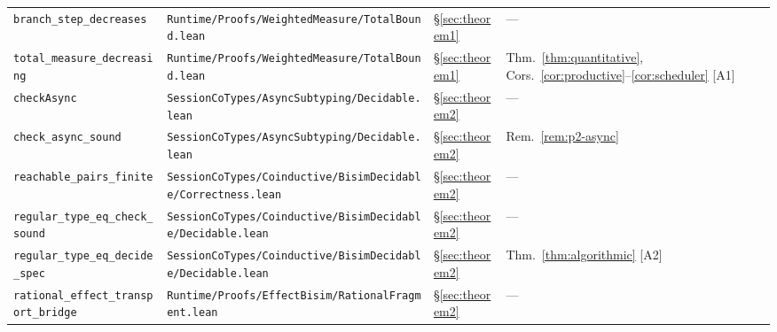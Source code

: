 \documentclass[a4paper,10pt,twocolumn,english]{article}
\numberwithin{equation}{section}
\theoremstyle{paperdef}
\theoremstyle{paperplain}
\theoremstyle{paperdef}
\theoremstyle{paperremark}
\begin{document}
\begin{table}[H]
\begin{tabularx}{\textwidth}{L{0.27\textwidth}L{0.37\textwidth}L{0.06\textwidth}>{\raggedright\arraybackslash}X}
		\texttt{branch\_step\_decreases}                                & \texttt{Runtime/\allowbreak Proofs/\allowbreak WeightedMeasure/\allowbreak}\mbox{\texttt{TotalBound.lean}}                        & \S\ref{sec:theorem1}     & ---                                                                               \\
		\texttt{total\_measure\_\allowbreak decreasing}                 & \texttt{Runtime/\allowbreak Proofs/\allowbreak WeightedMeasure/\allowbreak}\mbox{\texttt{TotalBound.lean}}                        & \S\ref{sec:theorem1}     & Thm.~\ref{thm:quantitative}, Cors.~\ref{cor:productive}--\ref{cor:scheduler} [A1] \\
		\texttt{checkAsync}                                             & \texttt{SessionCoTypes/\allowbreak AsyncSubtyping/\allowbreak}\mbox{\texttt{Decidable.lean}}                                      & \S\ref{sec:theorem2}     & ---                                                                               \\
		\texttt{check\_async\_\allowbreak sound}                        & \texttt{SessionCoTypes/\allowbreak AsyncSubtyping/\allowbreak}\mbox{\texttt{Decidable.lean}}                                      & \S\ref{sec:theorem2}     & Rem.~\ref{rem:p2-async}                                                           \\
		\texttt{reachable\_pairs\_\allowbreak finite}                   & \texttt{SessionCoTypes/\allowbreak Coinductive/\allowbreak BisimDecidable/\allowbreak}\mbox{\texttt{Correctness.lean}}            & \S\ref{sec:theorem2}     & ---                                                                               \\
		\texttt{regular\_type\_eq\_\allowbreak check\_sound}            & \texttt{SessionCoTypes/\allowbreak Coinductive/\allowbreak BisimDecidable/\allowbreak}\mbox{\texttt{Decidable.lean}}              & \S\ref{sec:theorem2}     & ---                                                                               \\
		\texttt{regular\_type\_eq\_\allowbreak decide\_spec}            & \texttt{SessionCoTypes/\allowbreak Coinductive/\allowbreak BisimDecidable/\allowbreak}\mbox{\texttt{Decidable.lean}}              & \S\ref{sec:theorem2}     & Thm.~\ref{thm:algorithmic} [A2]                                                   \\
		\texttt{rational\_effect\_\allowbreak transport\_bridge}        & \texttt{Runtime/\allowbreak Proofs/\allowbreak EffectBisim/\allowbreak}\mbox{\texttt{RationalFragment.lean}}                      & \S\ref{sec:theorem2}     & ---                                                                               \\

\end{tabularx}
\end{table}
\end{document}
